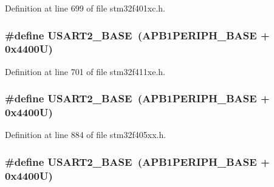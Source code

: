 Definition at line 699 of file stm32f401xc.\+h.

\subsubsection[{\texorpdfstring{U\+S\+A\+R\+T2\+\_\+\+B\+A\+SE}{USART2_BASE}}]{\setlength{\rightskip}{0pt plus 5cm}\#define U\+S\+A\+R\+T2\+\_\+\+B\+A\+SE~({\bf A\+P\+B1\+P\+E\+R\+I\+P\+H\+\_\+\+B\+A\+SE} + 0x4400\+U)}\hypertarget{group___peripheral__registers__structures_gade83162a04bca0b15b39018a8e8ec090}{}\label{group___peripheral__registers__structures_gade83162a04bca0b15b39018a8e8ec090}


Definition at line 701 of file stm32f411xe.\+h.

\subsubsection[{\texorpdfstring{U\+S\+A\+R\+T2\+\_\+\+B\+A\+SE}{USART2_BASE}}]{\setlength{\rightskip}{0pt plus 5cm}\#define U\+S\+A\+R\+T2\+\_\+\+B\+A\+SE~({\bf A\+P\+B1\+P\+E\+R\+I\+P\+H\+\_\+\+B\+A\+SE} + 0x4400\+U)}\hypertarget{group___peripheral__registers__structures_gade83162a04bca0b15b39018a8e8ec090}{}\label{group___peripheral__registers__structures_gade83162a04bca0b15b39018a8e8ec090}


Definition at line 884 of file stm32f405xx.\+h.

\subsubsection[{\texorpdfstring{U\+S\+A\+R\+T2\+\_\+\+B\+A\+SE}{USART2_BASE}}]{\setlength{\rightskip}{0pt plus 5cm}\#define U\+S\+A\+R\+T2\+\_\+\+B\+A\+SE~({\bf A\+P\+B1\+P\+E\+R\+I\+P\+H\+\_\+\+B\+A\+SE} + 0x4400\+U)}\hypertarget{group___peripheral__registers__structures_gade83162a04bca0b15b39018a8e8ec090}{}\label{group___peripheral__registers__structures_gade83162a04bca0b15b39018a8e8ec090}


